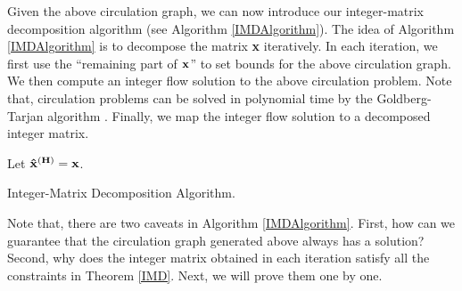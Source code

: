 \documentclass[letterpaper,twocolumn,10pt]{article}
\begin{document}
Given the above circulation graph, we can now introduce our integer-matrix decomposition algorithm (see Algorithm \ref{IMDAlgorithm}). The idea of Algorithm \ref{IMDAlgorithm} is to decompose the matrix {\bf x} iteratively. In each iteration, we first use the ``remaining part of $\bf x$'' to set bounds for the above circulation graph. We then compute an integer flow solution to the above circulation problem. Note that, circulation problems can be solved in polynomial time by the Goldberg-Tarjan algorithm \cite{PreFlow}. Finally, we map the integer flow solution to a decomposed integer matrix.

\begin{algorithm}[ht]
  Let $\bf \hat{x}^{(H)} = \bf x$.

\caption{Integer-Matrix Decomposition Algorithm.}\label{IMDAlgorithm}
\end{algorithm}

Note that, there are two caveats in Algorithm  \ref{IMDAlgorithm}. First, how can we guarantee that the circulation graph generated above always has a solution? Second, why does the integer matrix obtained in each iteration satisfy all the constraints in Theorem \ref{IMD}. Next, we will prove them one by one.
\end{document}
